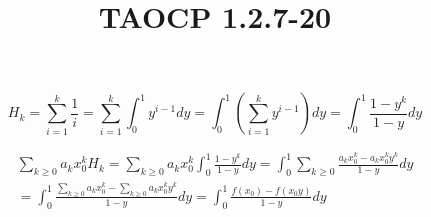 \documentclass{article}
\title{TAOCP 1.2.7\mbox{-}20}
\begin{document}
\maketitle

\[ H_{k} = \sum_{i=1}^{k} \frac{1}{i} = \sum_{i=1}^{k} \int_{0}^{1} y^{i-1}dy = \int_{0}^{1} (\sum_{i=1}^{k} y^{i-1}) dy = \int_{0}^{1} \frac{1-y^{k}}{1-y} dy \]

\begin{multline*}
\sum_{k \geq 0} a_{k}x_{0}^{k} H_{k} = \sum_{k \geq 0} a_{k}x_{0}^{k} \int_{0}^{1} \frac{1-y^{k}}{1-y} dy = \int_{0}^{1} \sum_{k \geq 0} \frac{a_{k}x_{0}^{k} - a_{k}x_{0}^{k}y^{k}}{1-y} dy \\
= \int_{0}^{1} \frac{\sum_{k \geq 0}a_{k}x_{0}^{k} - \sum_{k \geq 0}a_{k}x_{0}^{k}y^{k}}{1-y} dy = \int_{0}^{1} \frac{f(x_{0}) - f(x_{0}y)}{1-y} dy
\end{multline*}
\end{document}

